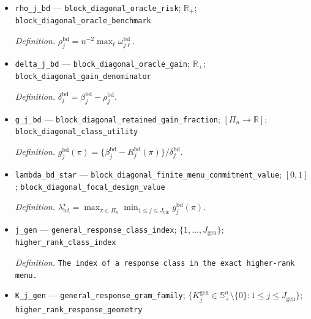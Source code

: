 \documentclass{article}
\begin{document}
\begin{itemize}
  \par\smallskip\noindent\emph{Definition.} \(\omega^{\mathrm{bd}}_{j\ell}=\min_{p_\ell\in\Delta_3}\lambda_{\max}\{L^{\mathrm{bd}}_{j\ell}(p_\ell)\}\).
  \item \texttt{rho\_\allowbreak{}j\_\allowbreak{}bd} --- \texttt{block\_\allowbreak{}diagonal\_\allowbreak{}oracle\_\allowbreak{}risk}; \(\mathbb R_+\); \texttt{block\_\allowbreak{}diagonal\_\allowbreak{}oracle\_\allowbreak{}benchmark}
  \par\smallskip\noindent\emph{Definition.} \(\rho_j^{\mathrm{bd}}=n^{-2}\max_\ell\omega^{\mathrm{bd}}_{j\ell}\).
  \item \texttt{delta\_\allowbreak{}j\_\allowbreak{}bd} --- \texttt{block\_\allowbreak{}diagonal\_\allowbreak{}oracle\_\allowbreak{}gain}; \(\mathbb R_+\); \texttt{block\_\allowbreak{}diagonal\_\allowbreak{}gain\_\allowbreak{}denominator}
  \par\smallskip\noindent\emph{Definition.} \(\delta_j^{\mathrm{bd}}=\beta_j^{\mathrm{bd}}-\rho_j^{\mathrm{bd}}\).
  \item \texttt{g\_\allowbreak{}j\_\allowbreak{}bd} --- \texttt{block\_\allowbreak{}diagonal\_\allowbreak{}retained\_\allowbreak{}gain\_\allowbreak{}fraction}; \([\Pi_n\to\mathbb R]\); \texttt{block\_\allowbreak{}diagonal\_\allowbreak{}class\_\allowbreak{}utility}
  \par\smallskip\noindent\emph{Definition.} \(g_j^{\mathrm{bd}}(\pi)=\{\beta_j^{\mathrm{bd}}-R_j^{\mathrm{bd}}(\pi)\}/\delta_j^{\mathrm{bd}}\).
  \item \texttt{lambda\_\allowbreak{}bd\_\allowbreak{}star} --- \texttt{block\_\allowbreak{}diagonal\_\allowbreak{}finite\_\allowbreak{}menu\_\allowbreak{}commitment\_\allowbreak{}value}; \([0,1]\); \texttt{block\_\allowbreak{}diagonal\_\allowbreak{}focal\_\allowbreak{}design\_\allowbreak{}value}
  \par\smallskip\noindent\emph{Definition.} \(\lambda_{\mathrm{bd}}^\star=\max_{\pi\in\Pi_n}\min_{1\le j\le J_{\mathrm{blk}}}g_j^{\mathrm{bd}}(\pi)\).
  \item \texttt{j\_\allowbreak{}gen} --- \texttt{general\_\allowbreak{}response\_\allowbreak{}class\_\allowbreak{}index}; \(\{1,\ldots,J_{\mathrm{gen}}\}\); \texttt{higher\_\allowbreak{}rank\_\allowbreak{}class\_\allowbreak{}index}
  \par\smallskip\noindent\emph{Definition.} \texttt{The index of a response class in the exact higher-\allowbreak{}rank menu.}
  \item \texttt{K\_\allowbreak{}j\_\allowbreak{}gen} --- \texttt{general\_\allowbreak{}response\_\allowbreak{}gram\_\allowbreak{}family}; \(\{K_j^{\mathrm{gen}}\in\mathbb S_+^n\setminus\{0\}:1\le j\le J_{\mathrm{gen}}\}\); \texttt{higher\_\allowbreak{}rank\_\allowbreak{}response\_\allowbreak{}geometry}

\end{itemize}
\end{document}
